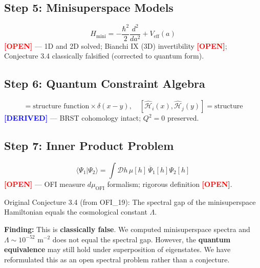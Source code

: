 \documentclass[12pt,a4paper]{article}
\theoremstyle{definition}
\newcommand{\DERIVED}[1]{\textbf{\textcolor{blue}{[DERIVED]}}}
\newcommand{\OPEN}[1]{\textbf{\textcolor{red}{[OPEN]}}}
\newcommand{\OFI}{\text{OFI}}
\begin{document}
\subsection{Step 5: Minisuperspace Models}
\begin{equation}
H_{\text{mini}} = -\frac{\hbar^2}{2} \frac{d^2}{da^2} + V_{\text{eff}}(a)
\end{equation}
\OPEN{Status: PARTIAL} — 1D and 2D solved; Bianchi IX (3D) invertibility \OPEN{OPEN}; Conjecture 3.4 classically falsified (corrected to quantum form).

\subsection{Step 6: Quantum Constraint Algebra}
\begin{equation}
[\hat{\mathcal{H}}(x), \hat{\mathcal{H}}(y)] = \text{structure function} \times \delta(x-y), \quad [\hat{\mathcal{H}}_i(x), \hat{\mathcal{H}}_j(y)] = \text{structure}
\end{equation}
\DERIVED{Status: DONE} — BRST cohomology intact; $Q^2 = 0$ preserved.

\subsection{Step 7: Inner Product Problem}
\begin{equation}
\langle \Psi_1 | \Psi_2 \rangle = \int \mathcal{D} h \, \mu[h] \, \overline{\Psi}_1[h] \Psi_2[h]
\end{equation}
\OPEN{Status: PARTIAL} — OFI measure $d\mu_{\OFI}$ formalism; rigorous definition \OPEN{OPEN}.

\begin{tcolorbox}[colback=yellow!20,colframe=orange!75!black,title=Honesty Box: Classical Falsification of Conjecture 3.4]
Original Conjecture 3.4 (from OFI\_19): The spectral gap of the minisuperspace Hamiltonian equals the cosmological constant $\Lambda$.

\textbf{Finding:} This is \textbf{classically false}. We computed minisuperspace spectra and $\Lambda \sim 10^{-52}$ m$^{-2}$ does not equal the spectral gap. However, the \textbf{quantum equivalence} may still hold under superposition of eigenstates. We have reformulated this as an open spectral problem rather than a conjecture.
\end{tcolorbox}

\newpage

\end{document}
